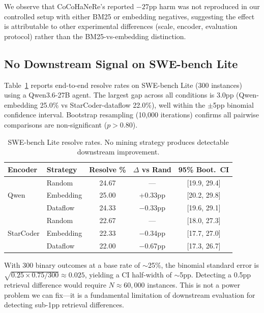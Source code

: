 \documentclass[11pt,a4paper]{article}
\begin{document}
We observe that CoCoHaNeRe's reported $-27$pp harm was not reproduced in our controlled setup with either BM25 or embedding negatives, suggesting the effect is attributable to other experimental differences (scale, encoder, evaluation protocol) rather than the BM25-vs-embedding distinction.

\subsection{No Downstream Signal on SWE-bench Lite}
\label{sec:swebench}

Table~\ref{tab:swebench} reports end-to-end resolve rates on SWE-bench Lite (300 instances) using a Qwen3.6-27B agent.
The largest gap across all conditions is 3.0pp (Qwen-embedding 25.0\% vs StarCoder-dataflow 22.0\%), well within the $\pm$5pp binomial confidence interval.
Bootstrap resampling (10,000 iterations) confirms all pairwise comparisons are non-significant ($p > 0.80$).

\begin{table}[t]
\centering
\caption{SWE-bench Lite resolve rates. No mining strategy produces detectable downstream improvement.}
\label{tab:swebench}
\small
\begin{tabular}{llccc}
\toprule
\textbf{Encoder} & \textbf{Strategy} & \textbf{Resolve \%} & \textbf{$\Delta$ vs Rand} & \textbf{95\% Boot.\ CI} \\
\midrule
\multirow{3}{*}{Qwen} & Random & 24.67 & --- & [19.9, 29.4] \\
 & Embedding & 25.00 & +0.33pp & [20.2, 29.8] \\
 & Dataflow & 24.33 & $-$0.33pp & [19.6, 29.1] \\
\midrule
\multirow{3}{*}{StarCoder} & Random & 22.67 & --- & [18.0, 27.3] \\
 & Embedding & 22.33 & $-$0.34pp & [17.7, 27.0] \\
 & Dataflow & 22.00 & $-$0.67pp & [17.3, 26.7] \\
\bottomrule
\end{tabular}
\end{table}

With 300 binary outcomes at a base rate of $\sim$25\%, the binomial standard error is $\sqrt{0.25 \times 0.75 / 300} \approx 0.025$, yielding a CI half-width of $\sim$5pp.
Detecting a 0.5pp retrieval difference would require $N \approx 60{,}000$ instances.
This is not a power problem we can fix---it is a fundamental limitation of downstream evaluation for detecting sub-1pp retrieval differences.
\end{document}
